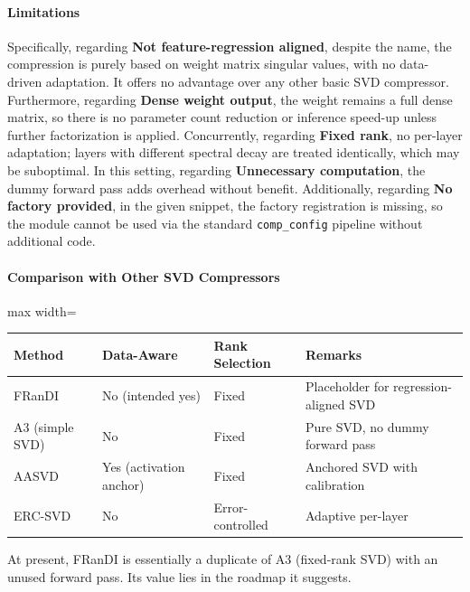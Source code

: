 \paragraph{Limitations}

Specifically, regarding \textbf{Not feature-regression aligned}, despite the name, the compression is purely based on weight matrix singular values, with no data-driven adaptation. It offers no advantage over any other basic SVD compressor. Furthermore, regarding \textbf{Dense weight output}, the weight remains a full dense matrix, so there is no parameter count reduction or inference speed-up unless further factorization is applied. Concurrently, regarding \textbf{Fixed rank}, no per-layer adaptation; layers with different spectral decay are treated identically, which may be suboptimal. In this setting, regarding \textbf{Unnecessary computation}, the dummy forward pass adds overhead without benefit. Additionally, regarding \textbf{No factory provided}, in the given snippet, the factory registration is missing, so the module cannot be used via the standard \texttt{comp\_config} pipeline without additional code.


\paragraph{Comparison with Other SVD Compressors}

\begin{center}
\begin{adjustbox}{max width=\columnwidth}
\renewcommand{\arraystretch}{1.2}
\begin{tabular}{llll}
\toprule
Method & Data-Aware & Rank Selection & Remarks \\
\midrule
FRanDI & No (intended yes) & Fixed & Placeholder for regression-aligned SVD \\
A3 (simple SVD) & No & Fixed & Pure SVD, no dummy forward pass \\
AASVD & Yes (activation anchor) & Fixed & Anchored SVD with calibration \\
ERC-SVD & No & Error-controlled & Adaptive per-layer \\

\bottomrule
\end{tabular}
\end{adjustbox}
\end{center}
At present, FRanDI is essentially a duplicate of A3 (fixed-rank SVD) with an unused forward pass. Its value lies in the roadmap it suggests.


